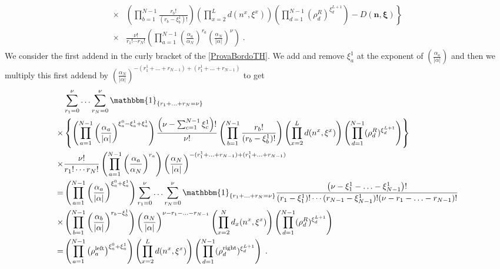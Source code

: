 \documentclass[10pt]{article}
\numberwithin{equation}{section}
\numberwithin{equation}{subsection}
\newcommand{\dt}{\;.}
\newcommand{\fra}[1]{\textcolor[rgb]{0,0,1}{#1}}
\begin{document}
{\begin{align}
	\\
	\times &\nonumber
	\left.\left(\prod_{b=1}^{N-1}\frac{r_{b}!}{(r_{b}-\xi^{1}_{b})!}\right)\left(\prod_{x=2}^{L}d(n^{x},\xi^{x})\right)\left(\prod_{d=1}^{N-1}(\rho_{d}^{R})^{\xi_{d}^{L+1}}\right)-D(\bm{n},\bm{\xi})\right\}
	\\\times &
	\frac{\nu!}{r_{1}!\cdots r_{N}!}\left(\prod_{a=1}^{N-1}\left(\frac{\alpha_{a}}{\alpha_{N}}\right)^{r_{a}}\left(\frac{\alpha_{N}}{|\alpha|}\right)^{\nu}\right)\dt
\end{align}
We consider the first addend in the curly bracket of the \eqref{ProvaBordoTH}. We add and remove $\xi_{a}^{1}$ at the exponent of $\left(\frac{\alpha_{a}}{|\alpha|}\right)$ \fra{and then we multiply} this first addend by $\left(\frac{\alpha_{N}}{|\alpha|}\right)^{-(r_{1}^{1}+\ldots+r_{N-1})+(r_{1}^{1}+\ldots+r_{N-1})}$ to get
\begin{align}\label{pezzo1}
	&\sum_{r_{1}=0}^{\nu}\ldots\sum_{r_{N}=0}^{\nu}\mathbbm{1}_{\{r_{1}+\ldots+r_{N}=\nu\}}\nonumber
	\\
	\times&
	\left\{\left(\prod_{a=1}^{N-1}\left(\frac{\alpha_{a}}{|\alpha|}\right)^{\xi_{a}^{0}-\xi_{a}^{1}+\xi_{a}^{1}}\right)\frac{\left(\nu-\sum_{c=1}^{N-1}\xi_{c}^{1}\right)!}{\nu!}\left(\prod_{b=1}^{N-1}\frac{r_{b}!}{(r_{b}-\xi^{1}_{b})!}\right)\left(\prod_{x=2}^{L}d(n^{x},\xi^{x})\right)\left(\prod_{d=1}^{N-1}(\rho_{d}^{R})^{\xi_{d}^{L+1}}\right)\right\}\nonumber\\
	\times	&\frac{\nu!}{r_{1}!\cdots r_{N}!}\left(\prod_{a=1}^{N-1}\left(\frac{\alpha_{a}}{\alpha_{N}}\right)^{r_{a}}\right)\left(\frac{\alpha_{N}}{|\alpha|}\right)^{-(r_{1}^{1}+\ldots+r_{N-1})+(r_{1}^{1}+\ldots+r_{N-1})}\nonumber
	\\=&
	\left(\prod_{a=1}^{N-1}\left(\frac{\alpha_{a}}{|\alpha|}\right)^{\xi_{a}^{0}+\xi_{a}^{1}}\right)\sum_{r_{1}=0}^{\nu}\ldots\sum_{r_{N}=0}^{\nu}\mathbbm{1}_{\{r_{1}+\ldots+r_{N}=\nu\}}	\frac{\left(\nu-\xi_{1}^{1}-\ldots-\xi_{N-1}^{1}\right)!}{(r_{1}-\xi_{1}^{1})!\cdots(r_{N-1}-\xi_{N-1}^{1})!(\nu-r_{1}-\ldots-r_{N-1})!}\nonumber\\
	\times& \left(\prod_{b=1}^{N-1}\left(\frac{\alpha_{b}}{|\alpha|}\right)^{r_{b}-\xi_{b}^{1}}\right)\left(\frac{\alpha_{N}}{|\alpha|}\right)^{\nu-r_{1}-\ldots-r_{N-1}}\left(\prod_{x=2}^{N}d_{x}(n^{x},\xi^{x})\right)\left(\prod_{d=1}^{N-1}(\rho_{d}^{R})^{\xi_{d}^{L+1}}\right)\nonumber
	\\=&
	\left(\prod_{a=1}^{N-1}\left(\rho_{a}^{\text{left}}\right)^{\xi_{a}^{0}+\xi_{a}^{1}}\right)\left(\prod_{x=2}^{L}d(n^{x},\xi^{x})\right)\left(\prod_{d=1}^{N-1}(\rho_{d}^{\text{right}})^{\xi_{d}^{L+1}}\right)\dt

\end{align}}
\end{document}
